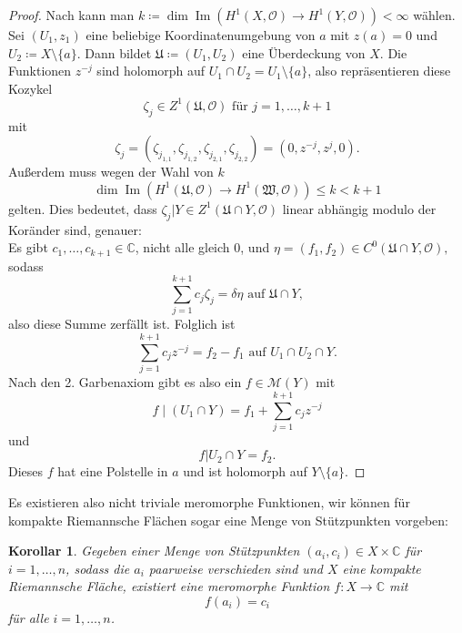 \documentclass[11pt,a4paper,toc=bibliography]{scrartcl}
\theoremstyle{thm}
\newtheorem{koro}{Korollar}[section]
\theoremstyle{def}
\theoremstyle{remark}
\DeclareMathOperator{\Ima}{Im}
\begin{document}
\begin{proof}
Nach  kann man $k\coloneqq \dim\Ima \left(H^1(X,\mathcal{O})\rightarrow H^1(Y,\mathcal{O})\right)<\infty $ wählen.
Sei $(U_1,z_1)$ eine beliebige Koordinatenumgebung von $a$ mit $z(a)=0$ und $U_2 \coloneqq X\setminus \{ a \}$. Dann bildet $\mathfrak{U}\coloneqq (U_1,U_2)$ eine Überdeckung von $X$. Die Funktionen $z^{-j}$ sind holomorph auf $U_1\cap U_2= U_1\setminus\{ a \}$, also repräsentieren diese Kozykel
\[
\zeta_j \in Z^1(\mathfrak{U},\mathcal{O})\text{ für } j=1,\ldots,k+1
\]
mit 
\[
\zeta_j =(\zeta_{j_{1,1}},\zeta_{j_{1,2}},\zeta_{j_{2,1}},\zeta_{j_{2,2}})=(0,z^{-j},z^j,0).
\]
Außerdem muss wegen der Wahl von $k$
\[
\dim\Ima \left(H^1(\mathfrak{U},\mathcal{O})\rightarrow H^1(\mathfrak{W},\mathcal{O})\right)\leq k<k+1
\]
gelten. Dies bedeutet, dass $\zeta_j|Y \in Z^1(\mathfrak{U}\cap Y,\mathcal{O})$ linear abhängig modulo der Koränder sind, genauer:\\
Es gibt $c_1,\dots,c_{k+1}\in\mathbb{C}$, nicht alle gleich $0$, und $\eta =(f_1,f_2)\in C^0(\mathfrak{U}\cap Y,\mathcal{O}),$ sodass
\[
\sum_{j=1}^{k+1} c_j\zeta_j = \delta\eta \text{ auf } \mathfrak{U}\cap Y,
\]
also diese Summe zerfällt ist. Folglich ist 
\[
\sum_{j=1}^{k+1}c_j z^{-j} = f_2 - f_1 \text{ auf } U_1 \cap U_2 \cap Y.
\]
Nach den 2. Garbenaxiom gibt es also ein $f\in \mathcal{M}(Y)$ mit \[f\mid (U_1\cap Y) =f_1 + \sum_{j=1}^{k+1}c_j z^{-j}\]
und 
\[
f|U_2\cap Y = f_2.
\]
Dieses $f$ hat eine Polstelle in $a$ und ist holomorph auf $Y\setminus \{ a \}$.
\end{proof}
Es existieren also nicht triviale meromorphe Funktionen, wir können für kompakte Riemannsche Flächen sogar eine Menge von Stützpunkten vorgeben:
\begin{koro}
Gegeben einer Menge von Stützpunkten $(a_i,c_i)\in X\times \mathbb{C}$ für $i=1,\ldots,n$, sodass die $a_i$ paarweise verschieden sind und $X$ eine kompakte Riemannsche Fläche, existiert eine meromorphe Funktion $f:X\rightarrow \mathbb{C}$ mit
\[
f(a_i)=c_i
\]
für alle $i=1,\ldots,n$.

\end{koro}
\end{document}

